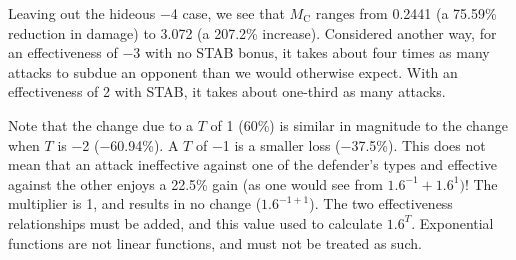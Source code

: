 Leaving out the hideous −4 case, we see that $M_\mathrm{C}$ ranges
 from 0.2441 (a 75.59\% reduction in damage) to 3.072
 (a 207.2\% increase).
Considered another way, for an effectiveness of −3 with no STAB bonus,
 it takes about four times as many attacks to subdue an opponent than
 we would otherwise expect.
With an effectiveness of 2 with STAB, it takes about one-third as many attacks.

Note that the change due to a $T$ of 1 (60\%) is similar in magnitude to the change
 when $T$ is −2 (−60.94\%). A $T$ of −1 is a smaller loss (\hbox{−37.5\%}).
This does not mean that an attack ineffective against one of the defender's types and
 effective against the other enjoys a 22.5\% gain (as one would see from $1.6^{−1} + 1.6^{1})$!
The multiplier is 1, and results in no change ($1.6^{−1+1}$).
The two effectiveness relationships must be added, and this value used to
 calculate $1.6^T$.
Exponential functions are not linear functions, and must not be treated as such.


